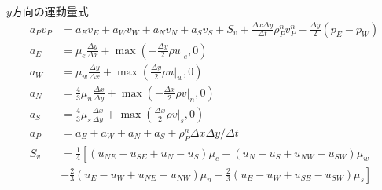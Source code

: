 \documentclass[a4paper,10pt,fleqn]{jsarticle}
\begin{document}
$y$方向の運動量式
\begin{align}
  a_Pv_P&=a_E v_E + a_W v_W + a_N v_N+a_S v_S +S_v +\frac{\Delta x\Delta
 y}{\Delta t}\rho_P^n v_P^n - \frac{\Delta y}{2}(p_E-p_W) \\
 a_E &= \mu_e \frac{\Delta y}{\Delta x} + \max(-\frac{\Delta
 y}{2} \rho u|_e, 0)\\
a_W &=  \mu_w \frac{\Delta y}{\Delta x} + \max(\frac{\Delta
 y}{2} \rho u|_w, 0)\\
 a_N &= \frac{4}{3}\mu_n \frac{\Delta x}{\Delta y} + \max(-\frac{\Delta
 x}{2} \rho v|_n, 0)\\
 a_S &= \frac{4}{3}\mu_s \frac{\Delta x}{\Delta y} + \max(\frac{\Delta
 x}{2} \rho v|_s, 0) \\
a_P &= a_E +a_W + a_N + a_S + \rho_P^n \Delta x \Delta y/\Delta t \\
S_v &= \frac{1}{4} \left[ 
(u_{NE}-u_{SE}+u_N-u_S) \mu_e
 - (u_N-u_S+u_{NW}-u_{SW}) \mu_w\right. \nonumber \\
&\left. -\frac{2}{3}(u_E-u_W +u_{NE} -u_{NW} )\mu_n + \frac{2}{3}(u_E-u_W+u_{SE}-u_{SW})\mu_s \right]
\end{align}
\end{document}
